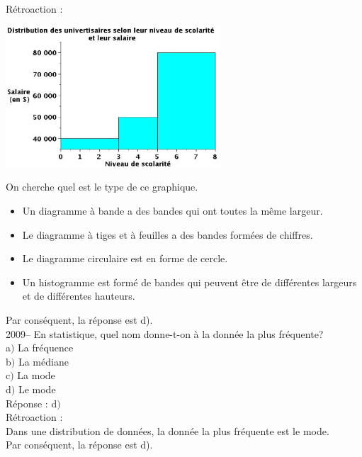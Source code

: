 \documentclass[letterpaper, 12pt]{article}
\begin{document}
R\'etroaction :
\begin{center}
 \includegraphics[width=8cm,bb=14 14 611 415]{Q2008v.eps}
\end{center}
On cherche quel est le type de ce graphique.\\
\begin{itemize}
 \item Un diagramme \`a bande a des bandes qui ont toutes la m\^eme largeur.\\
 \item Le diagramme \`a tiges et \`a feuilles a des bandes form\'ees de chiffres.\\
 \item Le diagramme circulaire est en forme de cercle.\\
 \item Un histogramme est form\'e de bandes qui peuvent \^etre de diff\'erentes largeurs et de diff\'erentes hauteurs.\\
\end{itemize}
Par cons\'equent, la r\'eponse est d).\\

2009-- En statistique, quel nom donne-t-on \`a la donn\'ee la plus fr\'equente?\\

a$)$ La fr\'equence \\
b$)$ La m\'ediane\\
c$)$ La mode\\
d$)$ Le mode\\

R\'eponse : d$)$\\

R\'etroaction :\\
Dans une distribution de donn\'ees, la donn\'ee la plus fr\'equente est le mode.\\
Par cons\'equent, la r\'eponse est d).\\
\end{document}
